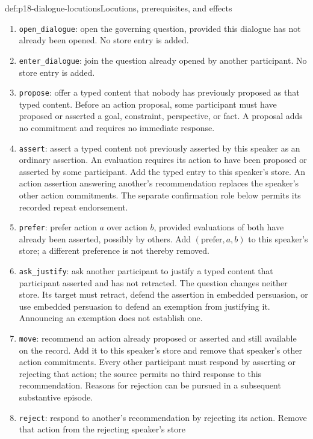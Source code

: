 \begin{hbmethod}{def:p18-dialogue-locutions}{Locutions, prerequisites, and effects}
\begin{enumerate}
\item \texttt{open\_dialogue}: open the governing question, provided
this dialogue has not already been opened. No store entry is added.
\item \texttt{enter\_dialogue}: join the question already opened by
another participant. No store entry is added.
\item \texttt{propose}: offer a typed content that nobody has previously
proposed as that typed content. Before an action proposal, some
participant must have proposed or asserted a goal, constraint,
perspective, or fact. A proposal adds no commitment and requires
no immediate response.
\item \texttt{assert}: assert a typed content not previously asserted
by this speaker as an ordinary assertion. An evaluation requires
its action to have been proposed or asserted by some participant.
Add the typed entry to this speaker's store. An action assertion
answering another's recommendation replaces the speaker's other
action commitments. The separate confirmation role below permits
its recorded repeat endorsement.
\item \texttt{prefer}: prefer action \(a\) over action \(b\), provided
evaluations of both have already been asserted, possibly by others.
Add \((\mathrm{prefer},a,b)\) to this speaker's store; a different
preference is not thereby removed.
\item \texttt{ask\_justify}: ask another participant to justify a typed
content that participant asserted and has not retracted.
The question changes neither store. Its target must retract, defend
the assertion in embedded persuasion, or use embedded persuasion to
defend an exemption from justifying it. Announcing an exemption
does not establish one.
\item \texttt{move}: recommend an action already proposed or asserted
and still available on the record. Add it to this speaker's store
and remove that speaker's other action commitments. Every other
participant must respond by asserting or rejecting that action;
the source permits no third response to this recommendation.
Reasons for rejection can be pursued in a subsequent substantive episode.
\item \texttt{reject}: respond to another's recommendation by rejecting
its action. Remove that action from the rejecting speaker's store

\end{enumerate}
\end{hbmethod}

